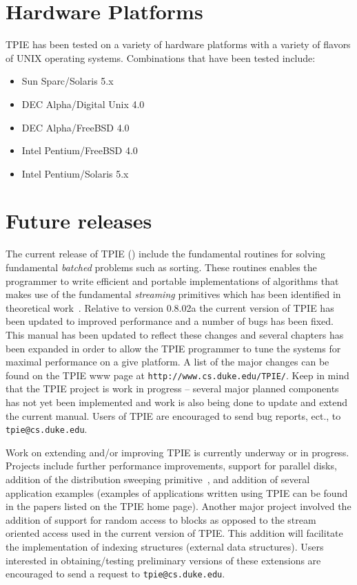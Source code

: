 \section{Hardware Platforms}

TPIE has been tested on a variety of hardware platforms with a variety of
flavors of UNIX operating systems. Combinations that have been tested
include:
\begin{itemize}
\item Sun Sparc/Solaris 5.x
\item DEC Alpha/Digital Unix 4.0
\item DEC Alpha/FreeBSD 4.0
\item Intel Pentium/FreeBSD 4.0
\item Intel Pentium/Solaris 5.x
\end{itemize}


\section{Future releases}

The current release of TPIE (\version) include the fundamental routines for
solving fundamental {\em batched} problems such as sorting. These routines
enables the programmer to write efficient and portable implementations of
algorithms that makes use of the fundamental {\em streaming} primitives
which has been identified in theoretical
work~\cite{arge:gisbook,vitter:podssurvey}. Relative to version 0.8.02a the
current version of TPIE has been updated to improved performance and a
number of bugs has been fixed. This manual has been updated to reflect
these changes and several chapters has been expanded in order to allow the
TPIE programmer to tune the systems for maximal performance on a give
platform. A list of the major changes can be found on the TPIE www page at
\verb|http://www.cs.duke.edu/TPIE/|. Keep in mind that the TPIE project is
work in progress -- several major planned components has not yet been
implemented and work is also being done to update and extend the current
manual. Users of TPIE are encouraged to send bug reports, ect., to
\verb|tpie@cs.duke.edu|.

Work on extending and/or improving TPIE is currently underway or in
progress. Projects include further performance improvements, support for
parallel disks, addition of the distribution sweeping
primitive~\cite{goodrich:external}, and addition of several application
examples (examples of applications written using TPIE can be found in the
papers listed on the TPIE home page). Another major project involved the
addition of support for random access to blocks as opposed to the stream
oriented access used in the current version of TPIE. This addition will
facilitate the implementation of indexing structures (external data
structures). Users interested in obtaining/testing preliminary versions of
these extensions are encouraged to send a request to
\verb|tpie@cs.duke.edu|.



